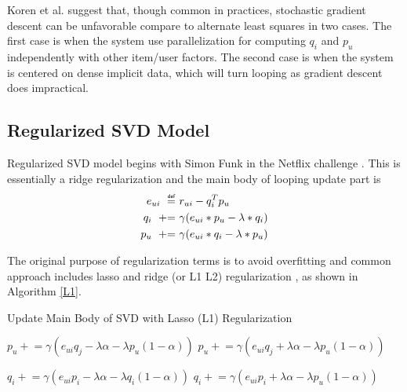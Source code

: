 \documentclass[letter paper, 11pt]{article}
\begin{document}
	Koren et al. \cite{MFinRS} suggest that, though common in practices, stochastic gradient descent can be unfavorable compare to alternate least squares in two cases. The first case is when the system use parallelization for computing $q_i$ and $p_u$ independently with other item/user factors. The second case is when the system is centered on dense implicit data, which will turn looping as gradient descent does impractical.

	

	\subsection{Regularized SVD Model}

	\newcommand\myeq{\mathrel{\overset{\makebox[0pt]{\mbox{\normalfont\tiny\sffamily def}}}{=}}}
	\newcommand{\pluseq}{\mathrel{+}=}

	Regularized SVD model begins with Simon Funk in the Netflix challenge \cite{MFinRS}. This is essentially a ridge regularization and the main body of looping update part is
	\begin{equation}
		\begin{split}
			e_{ui}\ \myeq&\ r_{ui} - q_i^T p_u \\
			q_i\ \pluseq&\ \gamma (e_{ui} * p_u - \lambda * q_i) \\
			p_u\ \pluseq&\ \gamma (e_{ui} * q_i - \lambda * p_u)
		\end{split}
	\end{equation}

	The original purpose of regularization terms is to avoid overfitting and common approach includes lasso and ridge (or L1 L2) regularization \cite{RSVD-News}, as shown in Algorithm \ref{L1}.
	
	\begin{algorithm}
		\caption{Update Main Body of SVD with Lasso (L1) Regularization\cite{RSVD-News}}
		\label{L1}
		\begin{algorithmic}
				\STATE $p_u \pluseq \gamma (e_{ui} q_j - \lambda \alpha - \lambda p_u ( 1 - \alpha))$
			\ELSE
				\STATE $p_u \pluseq \gamma (e_{ui} q_j + \lambda \alpha - \lambda p_u ( 1 - \alpha))$
			\ENDIF
			
				\STATE $q_i \pluseq \gamma (e_{ui} p_i - \lambda \alpha - \lambda q_i ( 1 - \alpha))$
			\ELSE
				\STATE $q_i \pluseq \gamma (e_{ui} p_i + \lambda \alpha - \lambda p_u ( 1 - \alpha))$			
			\ENDIF
		\end{algorithmic}
	\end{algorithm}
\end{document}
